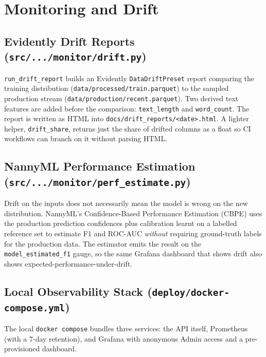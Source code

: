 \documentclass[11pt,a4paper]{article}
\begin{document}
\section{Monitoring and Drift}

\subsection{Evidently Drift Reports (\texttt{src/.../monitor/drift.py})}

\texttt{run\_drift\_report} builds an Evidently \texttt{DataDriftPreset} report
comparing the training distribution (\texttt{data/processed/train.parquet}) to the
sampled production stream (\texttt{data/production/recent.parquet}). Two derived
text features are added before the comparison: \texttt{text\_length} and
\texttt{word\_count}. The report is written as HTML into
\texttt{docs/drift\_reports/<date>.html}. A lighter helper, \texttt{drift\_share},
returns just the share of drifted columns as a float so CI workflows can branch on
it without parsing HTML.

\subsection{NannyML Performance Estimation (\texttt{src/.../monitor/perf\_estimate.py})}

Drift on the inputs does not necessarily mean the model is wrong on the new
distribution. NannyML's Confidence-Based Performance Estimation (CBPE) uses the
production prediction confidences plus calibration learnt on a labelled reference
set to estimate F1 and ROC-AUC \emph{without} requiring ground-truth labels for the
production data. The estimator emits the result on the \texttt{model\_estimated\_f1}
gauge, so the same Grafana dashboard that shows drift also shows
expected-performance-under-drift.

\subsection{Local Observability Stack (\texttt{deploy/docker-compose.yml})}

The local \texttt{docker compose} bundles three services: the API itself,
Prometheus (with a 7-day retention), and Grafana with anonymous Admin access and a
pre-provisioned dashboard.

\end{document}
